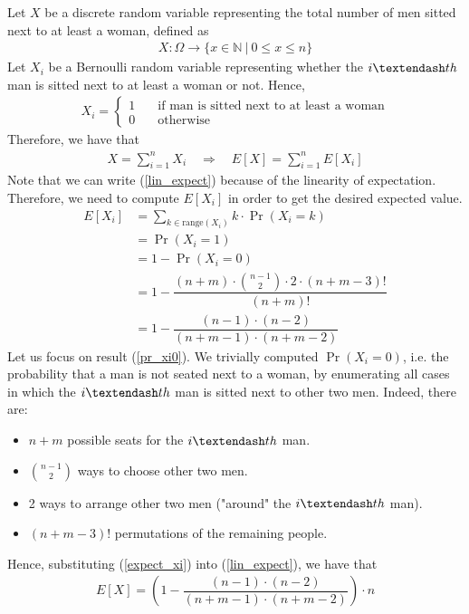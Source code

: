 Let $X$ be a discrete random variable representing the total number of men sitted next to at least a woman, defined as
\begin{align*}
	X: \Omega \rightarrow \{ x \in \mathbb{N} \ | \ 0 \leq x \leq n \}
\end{align*}
Let $X_i$ be a Bernoulli random variable representing whether the $i \textendash th$ man is sitted next to at least a woman or not. Hence,
\begin{align*}
	X_i = 
	\left\{ \begin{aligned}
		1 &\quad\text{if man is sitted next to at least a woman}\\
		0 &\quad\text{otherwise}
	\end{aligned}\right.
\end{align*}
Therefore, we have that
\begin{align}
	X = \sum_{i = 1}^{n}X_i \quad\Rightarrow\quad E\left[ X \right] = \sum_{i = 1}^{n} E\left[ X_i \right] \label{lin_expect}
\end{align}
Note that we can write (\ref{lin_expect}) because of the linearity of expectation.\\
Therefore, we need to compute $E\left[ X_i \right]$ in order to get the desired expected value.
\begin{align}
	E\left[ X_i \right] &= \sum_{k \in \mathrm{range}(X_i)} k \cdot \Pr(X_i = k)\nonumber\\
	&= \Pr(X_i = 1)\nonumber\\
	&= 1 - \Pr(X_i = 0)\nonumber\\
	&= 1 - \dfrac{(n+m) \cdot \binom{n-1}{2} \cdot 2 \cdot (n+m-3)!}{(n+m)!} \label{pr_xi0}\\
	&= 1 - \dfrac{(n-1) \cdot (n-2)}{(n+m-1) \cdot (n+m-2)} \label{expect_xi}
\end{align}
Let us focus on result (\ref{pr_xi0}). We trivially computed $\Pr(X_i = 0)$, i.e. the probability that a man is not seated next to a woman, by enumerating all cases in which the $i \textendash th$ man is sitted next to other two men. Indeed, there are:
\begin{itemize}
	\item $n+m$ possible seats for the $i \textendash th$ man.
	\item $\binom{n-1}{2}$ ways to choose other two men.
	\item 2 ways to arrange other two men ("around" the $i \textendash th$ man).
	\item $(n+m-3)!$ permutations of the remaining people.
\end{itemize}
Hence, substituting (\ref{expect_xi}) into (\ref{lin_expect}), we have that
\begin{align*}
	E\left[ X \right] = \left( 1 - \dfrac{(n-1) \cdot (n-2)}{(n+m-1) \cdot (n+m-2)} \right) \cdot n
\end{align*}














